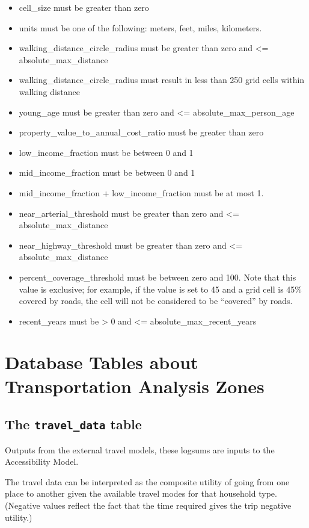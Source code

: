\begin{itemize} \tight
\item cell_size must be greater than zero
\item units must be one of the following: meters, feet, miles, kilometers.
\item walking_distance_circle_radius must be greater than zero and \textless{}= absolute_max_distance
\item walking_distance_circle_radius must result in less than 250 grid cells within walking distance
\item young_age must be greater than zero and \textless{}= absolute_max_person_age
\item property_value_to_annual_cost_ratio must be greater than zero
\item low_income_fraction must be between 0 and 1
\item mid_income_fraction must be between 0 and 1
\item mid_income_fraction + low_income_fraction must be at most 1.
\item near_arterial_threshold must be greater than zero and \textless{}= absolute_max_distance
\item near_highway_threshold must be greater than zero and \textless{}= absolute_max_distance
\item percent_coverage_threshold must be between zero and 100. Note that this value is exclusive; for example, if the value is set to 45 and a grid cell is 45\% covered by roads, the cell will not be considered to be ``covered'' by roads.
\item recent_years must be \textgreater{} 0 and \textless{}= absolute_max_recent_years

\end{itemize}

\section{Database Tables about Transportation Analysis Zones}

\subsection{The {\tt travel_data} table}

Outputs from the external travel models, these logsums are inputs to the
Accessibility Model. 


The travel data can be interpreted as the composite utility of going from one
place to another given the available travel modes for that household type.
(Negative values reflect the fact that the time required gives the trip
negative utility.)



